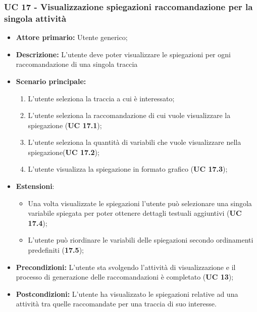 \subsubsection{UC 17 - Visualizzazione spiegazioni raccomandazione per la singola attività}
\begin{itemize}
	\item \textbf{Attore primario:} Utente generico;
	\item \textbf{Descrizione:} L'utente deve poter visualizzare le spiegazioni per ogni raccomandazione di una singola traccia
	\item \textbf{Scenario principale:} 
		\begin{enumerate}
			\item L'utente seleziona la traccia a cui è interessato;
			\item L'utente seleziona la raccomandazione di cui vuole visualizzare la spiegazione (\textbf{UC 17.1});
			\item L'utente seleziona la quantità di variabili che vuole visualizzare nella spiegazione(\textbf{UC 17.2});
			\item L'utente visualizza la spiegazione in formato grafico (\textbf{UC 17.3}); 
		\end{enumerate}
	\item \textbf{Estensioni}: 
	\begin{itemize}
		\item Una volta visualizzate le spiegazioni l'utente può selezionare una singola variabile spiegata per poter ottenere dettagli testuali aggiuntivi (\textbf{UC 17.4});
		\item L'utente può riordinare le variabili delle spiegazioni secondo ordinamenti predefiniti (\textbf{17.5});
	\end{itemize}

	\item \textbf{Precondizioni:} L'utente sta svolgendo l'attività di visualizzazione e il processo di generazione delle raccomandazioni è completato (\textbf{UC 13});
	\item \textbf{Postcondizioni:} L'utente ha visualizzato le spiegazioni relative ad una attività tra quelle raccomandate per una traccia di suo interesse.
\end{itemize}


